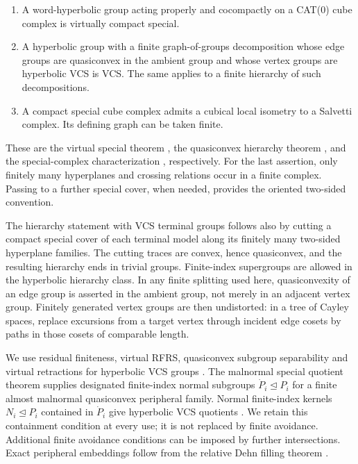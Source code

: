 \begin{proposition}\label{prop:compact-toolkit}
\begin{enumerate}
\item A word-hyperbolic group acting properly and cocompactly on a CAT(0) cube complex is virtually compact special.
\item A hyperbolic group with a finite graph-of-groups decomposition whose edge groups are quasiconvex in the ambient group and whose vertex groups are hyperbolic VCS is VCS. The same applies to a finite hierarchy of such decompositions.
\item A compact special cube complex admits a cubical local isometry to a Salvetti complex. Its defining graph can be taken finite.
\end{enumerate}
\end{proposition}

These are the virtual special theorem \cite[Theorem~1.1]{Agol2013}, the quasiconvex hierarchy theorem \cite[Theorem~13.1]{Wise2021}, and the special-complex characterization \cite[Proposition~3.10 and Theorem~4.2]{HaglundWise2008}, respectively. For the last assertion, only finitely many hyperplanes and crossing relations occur in a finite complex. Passing to a further special cover, when needed, provides the oriented two-sided convention.

The hierarchy statement with VCS terminal groups follows also by cutting a compact special cover of each terminal model along its finitely many two-sided hyperplane families. The cutting traces are convex, hence quasiconvex, and the resulting hierarchy ends in trivial groups. Finite-index supergroups are allowed in the hyperbolic hierarchy class. In any finite splitting used here, quasiconvexity of an edge group is asserted in the ambient group, not merely in an adjacent vertex group. Finitely generated vertex groups are then undistorted: in a tree of Cayley spaces, replace excursions from a target vertex through incident edge cosets by paths in those cosets of comparable length.

We use residual finiteness, virtual RFRS, quasiconvex subgroup separability and virtual retractions for hyperbolic VCS groups \cite{Agol2008,HaglundWise2008,HaglundWise2012,Wise2021}. The malnormal special quotient theorem supplies designated finite-index normal subgroups $\dot P_i\unlhd P_i$ for a finite almost malnormal quasiconvex peripheral family. Normal finite-index kernels $N_i\unlhd P_i$ contained in $\dot P_i$ give hyperbolic VCS quotients \cite[Theorem~2.7 and Corollary~2.8]{AGM2016}. We retain this containment condition at every use; it is not replaced by finite avoidance. Additional finite avoidance conditions can be imposed by further intersections. Exact peripheral embeddings follow from the relative Dehn filling theorem \cite[Theorem~1.1]{Osin2007}.

